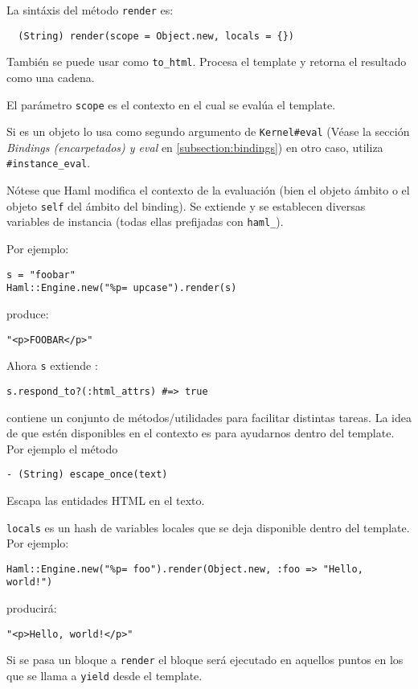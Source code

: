 La sintáxis del método \verb|render| es:
\begin{verbatim}
  (String) render(scope = Object.new, locals = {})
\end{verbatim}
También se puede usar como \verb|to_html|.
Procesa el template y retorna el resultado como una cadena.

El parámetro \verb|scope| es el contexto en el cual se evalúa el template.

Si es un objeto \Binding{} \haml{} lo usa como segundo 
argumento de 
\verb|Kernel#eval| (Véase la sección {\it Bindings (encarpetados) y eval} en 
\ref{subsection:bindings})
en otro caso, \haml{} utiliza 
\verb|#instance_eval|.

Nótese que Haml modifica el contexto de la evaluación (bien el objeto ámbito 
o el objeto \verb|self| del ámbito del binding).
Se extiende \hamlhelpers{} y se establecen diversas variables de instancia
(todas ellas prefijadas con \verb|haml_|).

Por ejemplo:

\begin{verbatim}
s = "foobar"
Haml::Engine.new("%p= upcase").render(s)
\end{verbatim}
produce:
\begin{verbatim}
"<p>FOOBAR</p>"
\end{verbatim}

Ahora \verb#s# extiende \hamlhelpers{}:
\begin{verbatim}
s.respond_to?(:html_attrs) #=> true
\end{verbatim}

\hamlhelpers{} contiene un conjunto de métodos/utilidades
para facilitar distintas tareas.
La idea de que estén disponibles en el contexto es para ayudarnos
dentro del template.
Por ejemplo el método
\begin{verbatim}
- (String) escape_once(text)
\end{verbatim}
Escapa las entidades HTML 
en el texto.

\verb|locals| es un hash de variables locales que se deja disponible dentro 
del template. Por ejemplo:

\begin{verbatim}
Haml::Engine.new("%p= foo").render(Object.new, :foo => "Hello, world!") 
\end{verbatim}
producirá:
\begin{verbatim}
"<p>Hello, world!</p>"
\end{verbatim}

Si se pasa un bloque a \verb|render| el bloque será ejecutado
en aquellos puntos en los que se llama a \verb|yield| desde el
template.

